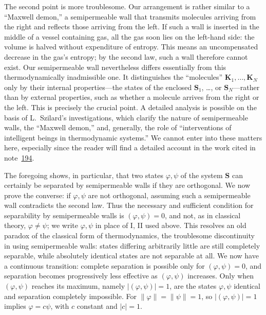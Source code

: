 \documentclass[fontsize=13pt,twoside,openany,headings=normal,parskip=false,bookmarkpackage=false,DIV=calc]{scrbook}
\begin{document}
The second point is more troublesome. Our arrangement is rather similar to a ``Maxwell demon,'' a semipermeable wall that transmits molecules arriving from the right and reflects those arriving from the left. If such a wall is inserted in the middle of a vessel containing gas, all the gas soon lies on the left-hand side: the volume is halved without expenditure of entropy. This means an uncompensated decrease in the gas's entropy; by the second law, such a wall therefore cannot exist. Our semipermeable wall nevertheless differs essentially from this thermodynamically inadmissible one. It distinguishes the ``molecules'' $\boldsymbol{K}_1,\ldots,\boldsymbol{K}_N$ only by their internal properties---the states of the enclosed $\boldsymbol{S}_1$, \ldots, or $\boldsymbol{S}_N$---rather than by external properties, such as whether a molecule arrives from the right or the left. This is precisely the crucial point. A detailed analysis is possible on the basis of L.~Szilard's investigations, which clarify the nature of semipermeable walls, the ``Maxwell demon,'' and, generally, the role of ``interventions of intelligent beings in thermodynamic systems.'' We cannot enter into these matters here, especially since the reader will find a detailed account in the work cited in note~\hyperlink{note-194}{194}.

The foregoing shows, in particular, that two states $\varphi,\psi$ of the system $\boldsymbol{S}$ can certainly be separated by semipermeable walls if they are orthogonal. We now prove the converse: if $\varphi,\psi$ are not orthogonal, assuming such a semipermeable wall contradicts the second law. Thus the necessary and sufficient condition for separability by semipermeable walls is $(\varphi,\psi)=0$, and not, as in classical theory, $\varphi\ne\psi$; we write $\varphi,\psi$ in place of I, II used above. This resolves an old paradox of the classical form of thermodynamics, the troublesome discontinuity in using
\hypertarget{origpage-198}{}%
semipermeable walls: states differing arbitrarily little are still completely separable, while absolutely identical states are not separable at all. We now have a continuous transition: complete separation is possible only for $(\varphi,\psi)=0$, and separation becomes progressively less effective as $(\varphi,\psi)$ increases. Only when $(\varphi,\psi)$ reaches its maximum, namely $|(\varphi,\psi)|=1$, are the states $\varphi,\psi$ identical and separation completely impossible. For $\|\varphi\|=\|\psi\|=1$, so $|(\varphi,\psi)|=1$ implies $\varphi=c\psi$, with $c$ constant and $|c|=1$.
\end{document}
